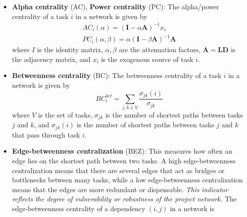 \documentclass[preprint,
3p]{elsarticle} %
\begin{document}
\begin{appendices}
\begin{itemize}
  \textbf{Eigenvector centrality} (EC) / \textbf{PageRank centrality}
  (PRC): The eigenvector centrality/PageRank centrality of a task \(i\)
  in a network is given by \begin{eqnarray}
  EC_i = \frac {1} {\lambda} \sum {j \in V} l{ij} EC_j \label{eq:EC}  \\
  PRC_i = \alpha \sum {j \in V} \frac {l{ji} PRC_j} {k_j^{out}} + \frac {1-\alpha} {n} \label{eq:PRC}
  \end{eqnarray} \noindent where \(V\) is the set of tasks, \(l_{ij}\)
  is the element (edge) from the logic domain (adjacency matrix), and
  \(\lambda\) is the largest eigenvalue of the adjacency matrix,
  \(k_j^{out}\) is the out-degree of task \(j\), and \(\alpha\) is the
  damping factor.
\item
  \textbf{Alpha centrality} (AC), \textbf{Power centrality} (PC): The
  alpha/power centrality of a task \(i\) in a network is given by
  \begin{eqnarray}
  AC_i({\alpha}) = (\mathbf{I} - \alpha \mathbf{A})^{-1} x_i \label{eq:AC} \\
  PC_i({\alpha},\beta) = \alpha (\mathbf{I} - \beta \mathbf{A})^{-1}\mathbf{A} \label{eq:PC}
  \end{eqnarray} \noindent where \(I\) is the identity matrix,
  \(\alpha, \beta\) are the attenuation factors,
  \(\mathbf{A}=\mathbf{LD}\) is the adjacency matrix, and \(x_i\) is the
  exogenous source of task \(i\).
\item
  \textbf{Betweenness centrality} (BC): The betweenness centrality of a
  task \(i\) in a network is given by \begin{equation}
  BC_i^{bet} = \sum_{j,k \in V} \frac {\sigma_{jk}(i)} {\sigma_{jk}} \label{eq:BC}
  \end{equation} \noindent where \(V\) is the set of tasks,
  \(\sigma_{jk}\) is the number of shortest paths between tasks \(j\)
  and \(k\), and \(\sigma_{jk}(i)\) is the number of shortest paths
  between tasks \(j\) and \(k\) that pass through task \(i\).
\item
  \textbf{Edge-betweenness centralization} (BEZ): This measures how
  often an edge lies on the shortest path between two tasks. A high
  edge-betweenness centralization means that there are several edges
  that act as bridges or bottlenecks between many tasks, while a low
  edge-betweenness centralization means that the edges are more
  redundant or dispensable. \emph{This indicator reflects the degree of
  vulnerability or robustness of the project network.} The
  edge-betweenness centrality of a dependency \((i,j)\) in a network is

\end{itemize}
\end{appendices}
\end{document}
